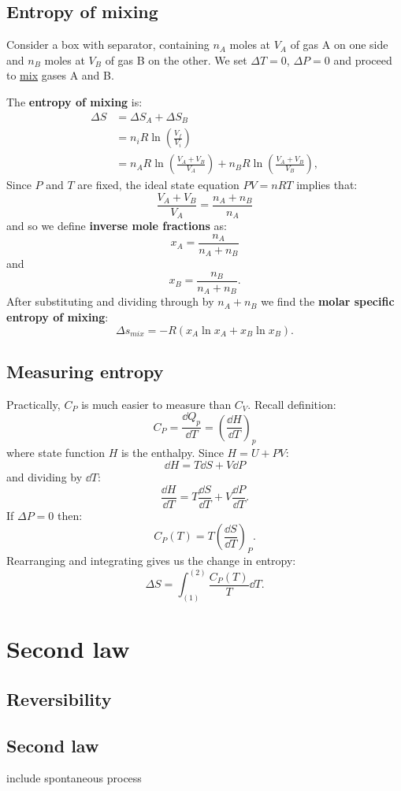 \documentclass{article}
\begin{document}
\newpage

\subsection{Entropy of mixing}
Consider a box with separator, containing $n_A$ moles at $V_A$ of gas A on one side and $n_B$ moles at $V_B$ of gas B on the other. We set $\Delta T=0$, $\Delta P=0$ and proceed to \underline{mix} gases A and B.

The \textbf{entropy of mixing} is:
\begin{align*}
    \Delta S
    &=\Delta S_A+\Delta S_B \\
    &=n_i R\ln\left(\frac{V_f}{V_i}\right) \\
    &=n_A R\ln\left(\frac{V_A+V_B}{V_A}\right)
    +n_B R\ln\left(\frac{V_A+V_B}{V_B}\right),
\end{align*}
Since $P$ and $T$ are fixed, the ideal state equation $PV=nRT$ implies that:
$$\frac{V_A+V_B}{V_A}=\frac{n_A+n_B}{n_A}$$
and so we define \textbf{inverse mole fractions} as:
$$x_A=\frac{n_A}{n_A+n_B}$$
and
$$x_B=\frac{n_B}{n_A+n_B}.$$
After substituting and dividing through by $n_A+n_B$ we find the \textbf{molar specific entropy of mixing}:
$$\Delta s_{mix}=-R(x_A\ln x_A+x_B\ln x_B).$$

\subsection{Measuring entropy}
Practically, $C_P$ is much easier to measure than $C_V$. Recall definition:
$$C_P=\frac{\dd Q_p}{\dd T}=\left(\frac{\dd H}{\dd T}\right)_p$$
where state function $H$ is the enthalpy. Since $H=U+PV$:
$$\dd H=T\dd S+V\dd P$$
and dividing by $\dd T$:
$$\frac{\dd H}{\dd T}=T\frac{\dd S}{\dd T}+V\frac{\dd P}{\dd T}.$$
If $\Delta P=0$ then:
$$C_P(T)=T\left(\frac{\dd S}{\dd T}\right)_P.$$
Rearranging and integrating gives us the change in entropy:
$$\Delta S=\int_{(1)}^{(2)}\frac{C_P(T)}{T}\dd T.$$

\newpage

\section{Second law}

\subsection{Reversibility}

\subsection{Second law}
include spontaneous process
\end{document}
